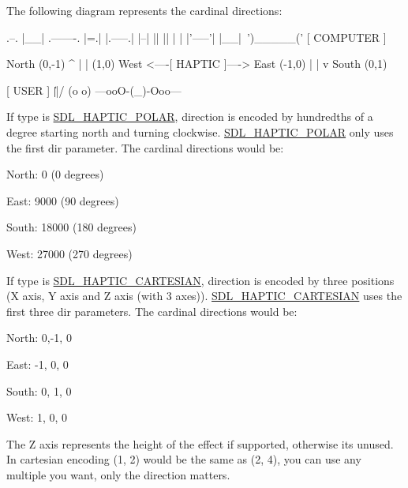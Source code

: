 The following diagram represents the cardinal directions\+: \begin{DoxyVerb}             .--.
             |__| .-------.
             |=.| |.-----.|
             |--| ||     ||
             |  | |'-----'|
             |__|~')_____('
               [ COMPUTER ]


                 North (0,-1)
                     ^
                     |
                     |
(1,0)  West <----[ HAPTIC ]----> East (-1,0)
                     |
                     |
                     v
                  South (0,1)


                  [ USER ]
                    \|||/
                    (o o)
              ---ooO-(_)-Ooo---
\end{DoxyVerb}


If type is \hyperlink{_s_d_l__haptic_8h_acdc35e97e5525472054a67b76e518f3b}{S\+D\+L\+\_\+\+H\+A\+P\+T\+I\+C\+\_\+\+P\+O\+L\+A\+R}, direction is encoded by hundredths of a degree starting north and turning clockwise. \hyperlink{_s_d_l__haptic_8h_acdc35e97e5525472054a67b76e518f3b}{S\+D\+L\+\_\+\+H\+A\+P\+T\+I\+C\+\_\+\+P\+O\+L\+A\+R} only uses the first {\ttfamily dir} parameter. The cardinal directions would be\+:
\begin{DoxyItemize}
\item North\+: 0 (0 degrees)
\item East\+: 9000 (90 degrees)
\item South\+: 18000 (180 degrees)
\item West\+: 27000 (270 degrees)
\end{DoxyItemize}

If type is \hyperlink{_s_d_l__haptic_8h_af8b2430a363a968de2a5b64c8f663d3b}{S\+D\+L\+\_\+\+H\+A\+P\+T\+I\+C\+\_\+\+C\+A\+R\+T\+E\+S\+I\+A\+N}, direction is encoded by three positions (X axis, Y axis and Z axis (with 3 axes)). \hyperlink{_s_d_l__haptic_8h_af8b2430a363a968de2a5b64c8f663d3b}{S\+D\+L\+\_\+\+H\+A\+P\+T\+I\+C\+\_\+\+C\+A\+R\+T\+E\+S\+I\+A\+N} uses the first three {\ttfamily dir} parameters. The cardinal directions would be\+:
\begin{DoxyItemize}
\item North\+: 0,-\/1, 0
\item East\+: -\/1, 0, 0
\item South\+: 0, 1, 0
\item West\+: 1, 0, 0
\end{DoxyItemize}

The Z axis represents the height of the effect if supported, otherwise it\textquotesingle{}s unused. In cartesian encoding (1, 2) would be the same as (2, 4), you can use any multiple you want, only the direction matters.

